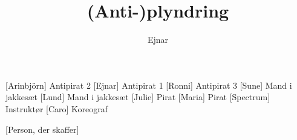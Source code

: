 \documentclass[a4paper,11pt]{article}
\title{(Anti-)plyndring}
\author{Ejnar}
\begin{document}
\maketitle

\begin{roles}
[Arinbjörn] Antipirat 2
[Ejnar] Antipirat 1
[Ronni] Antipirat 3
[Sune] Mand i jakkesæt
[Lund] Mand i jakkesæt
[Julie] Pirat
[Maria] Pirat 
[Spectrum] Instruktør
[Caro] Koreograf
\end{roles}

\begin{props}
[Person, der skaffer]
\end{props}
\end{document}
